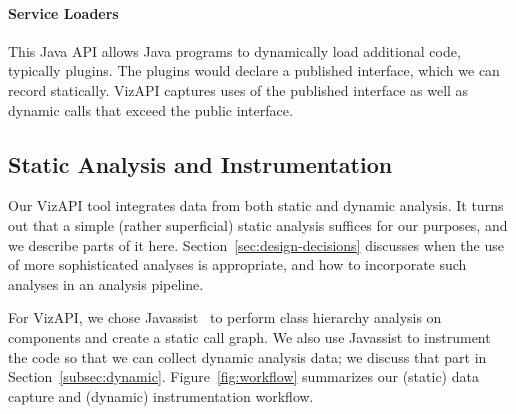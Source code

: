 \paragraph{Service Loaders} This Java API allows Java programs to dynamically load additional code, typically plugins. The plugins would declare a published interface, which we can record statically. VizAPI captures uses of the published interface as well as dynamic calls that exceed the public interface.

\subsection{Static Analysis and Instrumentation}
\label{subsec:static}
Our VizAPI tool integrates data from both static and dynamic analysis.
It turns out that a simple (rather superficial) static analysis suffices
for our purposes, and we describe parts of it here. Section~\ref{sec:design-decisions}
discusses when the use of more sophisticated analyses is appropriate, and
how to incorporate such analyses in an analysis pipeline.

For VizAPI, we chose Javassist~\cite{chiba00:_load_struc_reflec_java} to
perform class hierarchy analysis on components and create a static call
graph. We also use Javassist to instrument the code so that we can
collect dynamic analysis data; we discuss that part in
Section~\ref{subsec:dynamic}. Figure~\ref{fig:workflow} summarizes our
(static) data capture and (dynamic) instrumentation workflow.  \\

